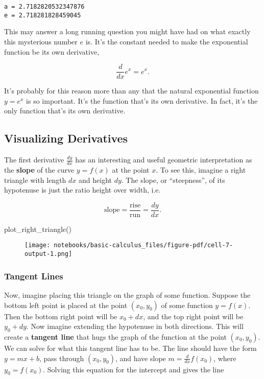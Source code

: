 \documentclass[
  letterpaper,
  DIV=11,
  numbers=noendperiod]{scrreprt}
\newenvironment{Shaded}{\begin{snugshade}}{\end{snugshade}}
\newcommand{\NormalTok}[1]{\textcolor[rgb]{0.00,0.23,0.31}{#1}}
\begin{document}
\begin{verbatim}
a = 2.7182820532347876
e = 2.718281828459045
\end{verbatim}

This may answer a long running question you might have had on what
exactly this mysterious number \(e\) is. It's the constant needed to
make the exponential function be its own derivative,

\[\frac{d}{dx} e^x = e^x.\]

It's probably for this reason more than any that the natural exponential
function \(y=e^x\) is so important. It's the function that's its own
derivative. In fact, it's the only function that's its own derivative.

\hypertarget{visualizing-derivatives}{%
\subsection{Visualizing Derivatives}\label{visualizing-derivatives}}

The first derivative \(\frac{dy}{dx}\) has an interesting and useful
geometric interpretation as the \textbf{slope} of the curve \(y=f(x)\)
at the point \(x\). To see this, imagine a right triangle with length
\(dx\) and height \(dy\). The slope, or ``steepness'', of its hypotenuse
is just the ratio height over width, i.e.~

\[\text{slope} = \frac{\text{rise}}{\text{run}} = \frac{dy}{dx}.\]

\begin{Shaded}
\begin{Highlighting}[]
\NormalTok{plot\_right\_triangle()}
\end{Highlighting}
\end{Shaded}

\begin{figure}[H]

{\centering \texttt{[image: notebooks/basic-calculus\_files/figure-pdf/cell-7-output-1.png]}

}

\end{figure}

\hypertarget{tangent-lines}{%
\subsubsection{Tangent Lines}\label{tangent-lines}}

Now, imagine placing this triangle on the graph of some function.
Suppose the bottom left point is placed at the point \((x_0,y_0)\) of
some function \(y=f(x)\). Then the bottom right point will be
\(x_0+dx\), and the top right point will be \(y_0+dy\). Now imagine
extending the hypotenuse in both directions. This will create a
\textbf{tangent line} that hugs the graph of the function at the point
\((x_0,y_0)\). We can solve for what this tangent line has to be. The
line should have the form \(y=mx+b\), pass through \((x_0,y_0)\), and
have slope \(m=\frac{d}{dx}f(x_0)\), where \(y_0=f(x_0)\). Solving this
equation for the intercept and gives the line
\end{document}
